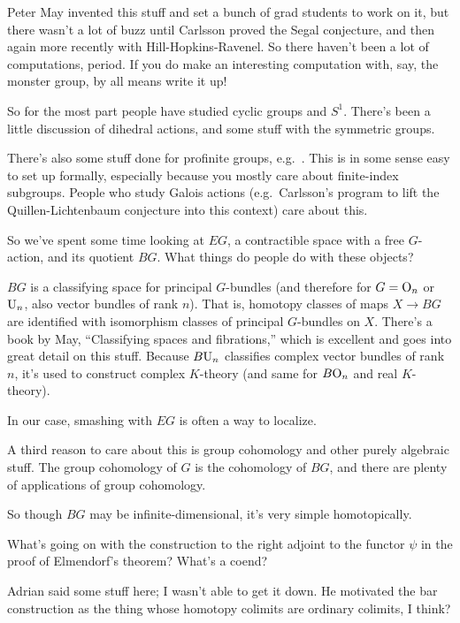 Peter May invented this stuff and set a bunch of grad students to work on it, but there wasn't a lot of buzz until
Carlsson proved the Segal conjecture, and then again more recently with Hill-Hopkins-Ravenel. So there haven't been
a lot of computations, period. If you do make an interesting computation with, say, the monster group, by all means
write it up!

So for the most part people have studied cyclic groups and $S^1$. There's been a little discussion of dihedral
actions, and some stuff with the symmetric groups.

There's also some stuff done for profinite groups, e.g.~\cite{Fausk}. This is in some sense easy to set up
formally, especially because you mostly care about finite-index subgroups. People who study Galois actions (e.g.\
Carlsson's program to lift the Quillen-Lichtenbaum conjecture into this context) care about this.
\begin{ques}
So we've spent some time looking at $EG$, a contractible space with a free $G$-action, and its quotient $BG$. What
things do people do with these objects?
\end{ques}
$BG$ is a classifying space for principal $G$-bundles (and therefore for $G = \mathrm O_n$ or $\mathrm U_n$, also vector bundles
of rank $n$). That is, homotopy classes of maps $X\to BG$ are identified with isomorphism classes of principal
$G$-bundles on $X$. There's a book by May, ``Classifying spaces and fibrations,'' which is excellent and goes into
great detail on this stuff. Because $B\mathrm U_n$ classifies complex vector bundles of rank $n$, it's used to construct
complex $K$-theory (and same for $B\mathrm O_n$ and real $K$-theory).

In our case, smashing with $EG$ is often a way to localize.

A third reason to care about this is group cohomology
and other purely algebraic stuff. The group cohomology of $G$ is the cohomology of $BG$, and there are plenty of
applications of group cohomology.

So though $BG$ may be infinite-dimensional, it's very simple homotopically.
\begin{ques}
What's going on with the construction to the right adjoint to the functor $\psi$ in the proof of Elmendorf's
theorem? What's a coend?
\end{ques}
Adrian said some stuff here; I wasn't able to get it down. He motivated the bar construction as the thing whose
homotopy colimits are ordinary colimits, I think?

